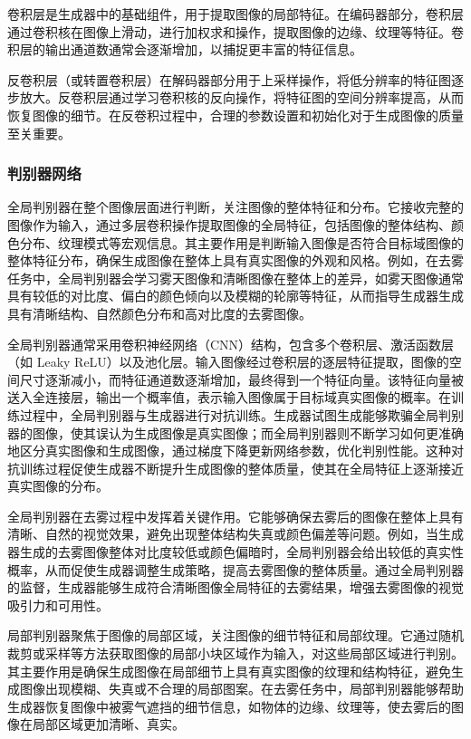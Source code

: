 
卷积层是生成器中的基础组件，用于提取图像的局部特征。在编码器部分，卷积层通过卷积核在图像上滑动，进行加权求和操作，提取图像的边缘、纹理等特征。卷积层的输出通道数通常会逐渐增加，以捕捉更丰富的特征信息。

反卷积层（或转置卷积层）在解码器部分用于上采样操作，将低分辨率的特征图逐步放大。反卷积层通过学习卷积核的反向操作，将特征图的空间分辨率提高，从而恢复图像的细节。在反卷积过程中，合理的参数设置和初始化对于生成图像的质量至关重要。



\subsubsection{判别器网络}

全局判别器在整个图像层面进行判断，关注图像的整体特征和分布。它接收完整的图像作为输入，通过多层卷积操作提取图像的全局特征，包括图像的整体结构、颜色分布、纹理模式等宏观信息。其主要作用是判断输入图像是否符合目标域图像的整体特征分布，确保生成图像在整体上具有真实图像的外观和风格。例如，在去雾任务中，全局判别器会学习雾天图像和清晰图像在整体上的差异，如雾天图像通常具有较低的对比度、偏白的颜色倾向以及模糊的轮廓等特征，从而指导生成器生成具有清晰结构、自然颜色分布和高对比度的去雾图像。

全局判别器通常采用卷积神经网络（CNN）结构，包含多个卷积层、激活函数层（如 Leaky ReLU）以及池化层。输入图像经过卷积层的逐层特征提取，图像的空间尺寸逐渐减小，而特征通道数逐渐增加，最终得到一个特征向量。该特征向量被送入全连接层，输出一个概率值，表示输入图像属于目标域真实图像的概率。在训练过程中，全局判别器与生成器进行对抗训练。生成器试图生成能够欺骗全局判别器的图像，使其误认为生成图像是真实图像；而全局判别器则不断学习如何更准确地区分真实图像和生成图像，通过梯度下降更新网络参数，优化判别性能。这种对抗训练过程促使生成器不断提升生成图像的整体质量，使其在全局特征上逐渐接近真实图像的分布。


全局判别器在去雾过程中发挥着关键作用。它能够确保去雾后的图像在整体上具有清晰、自然的视觉效果，避免出现整体结构失真或颜色偏差等问题。例如，当生成器生成的去雾图像整体对比度较低或颜色偏暗时，全局判别器会给出较低的真实性概率，从而促使生成器调整生成策略，提高去雾图像的整体质量。通过全局判别器的监督，生成器能够生成符合清晰图像全局特征的去雾结果，增强去雾图像的视觉吸引力和可用性。


局部判别器聚焦于图像的局部区域，关注图像的细节特征和局部纹理。它通过随机裁剪或采样等方法获取图像的局部小块区域作为输入，对这些局部区域进行判别。其主要作用是确保生成图像在局部细节上具有真实图像的纹理和结构特征，避免生成图像出现模糊、失真或不合理的局部图案。在去雾任务中，局部判别器能够帮助生成器恢复图像中被雾气遮挡的细节信息，如物体的边缘、纹理等，使去雾后的图像在局部区域更加清晰、真实。

